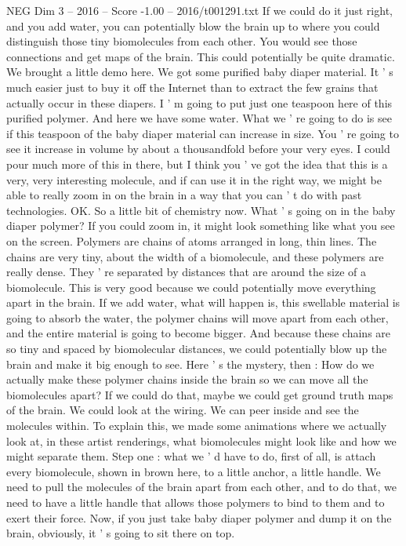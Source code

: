 \begin{textsample}{NEG Dim 3 – 2016 – Score -1.00 – 2016/t001291.txt}
If we could do it just right, and you add water, you can potentially blow the brain up to where you could distinguish those tiny biomolecules from each other.
You would see those connections and get maps of the brain.
This could potentially be quite dramatic.
We brought a little demo here.
We got some purified baby diaper material.
It ' s much easier just to buy it off the Internet than to extract the few grains that actually occur in these diapers.
I ' m going to put just one teaspoon here of this purified polymer.
And here we have some water.
What we ' re going to do is see if this teaspoon of the baby diaper material can increase in size.
You ' re going to see it increase in volume by about a thousandfold before your very eyes.
I could pour much more of this in there, but I think you ' ve got the idea that this is a very, very interesting molecule, and if can use it in the right way, we might be able to really zoom in on the brain in a way that you can ' t do with past technologies.
OK.
So a little bit of chemistry now.
What ' s going on in the baby diaper polymer?
If you could zoom in, it might look something like what you see on the screen.
Polymers are chains of atoms arranged in long, thin lines.
The chains are very tiny, about the width of a biomolecule, and these polymers are really dense.
They ' re separated by distances that are around the size of a biomolecule.
This is very good because we could potentially move everything apart in the brain.
If we add water, what will happen is, this swellable material is going to absorb the water, the polymer chains will move apart from each other, and the entire material is going to become bigger.
And because these chains are so tiny and spaced by biomolecular distances, we could potentially blow up the brain and make it big enough to see.
Here ' s the mystery, then : How do we actually make these polymer chains inside the brain so we can move all the biomolecules apart?
If we could do that, maybe we could get ground truth maps of the brain.
We could look at the wiring.
We can peer inside and see the molecules within.
To explain this, we made some animations where we actually look at, in these artist renderings, what biomolecules might look like and how we might separate them.
Step one : what we ' d have to do, first of all, is attach every biomolecule, shown in brown here, to a little anchor, a little handle.
We need to pull the molecules of the brain apart from each other, and to do that, we need to have a little handle that allows those polymers to bind to them and to exert their force.
Now, if you just take baby diaper polymer and dump it on the brain, obviously, it ' s going to sit there on top.

\end{textsample}
